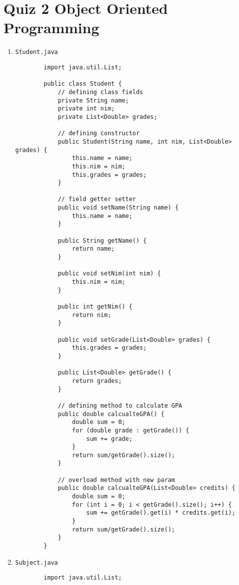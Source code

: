 \documentclass[12pt,titlepage]{article}
\begin{document}
\section{Quiz 2 Object Oriented Programming}
\begin{enumerate}
    \item \texttt{Student.java}
    \begin{verbatim}
        import java.util.List;

        public class Student {
            // defining class fields
            private String name;
            private int nim;
            private List<Double> grades;

            // defining constructor
            public Student(String name, int nim, List<Double> grades) {
                this.name = name;
                this.nim = nim;
                this.grades = grades;
            }

            // field getter setter
            public void setName(String name) {
                this.name = name;
            }

            public String getName() {
                return name;
            }

            public void setNim(int nim) {
                this.nim = nim;
            }

            public int getNim() {
                return nim;
            }

            public void setGrade(List<Double> grades) {
                this.grades = grades;
            }

            public List<Double> getGrade() {
                return grades;
            }

            // defining method to calculate GPA
            public double calcualteGPA() {
                double sum = 0;
                for (double grade : getGrade()) {
                    sum += grade;
                }
                return sum/getGrade().size();
            }

            // overload method with new param
            public double calcualteGPA(List<Double> credits) {
                double sum = 0;
                for (int i = 0; i < getGrade().size(); i++) {
                    sum += getGrade().get(i) * credits.get(i);
                }
                return sum/getGrade().size();
            }
        }
    \end{verbatim}
    \item \texttt{Subject.java}
    \begin{verbatim}
        import java.util.List;


\end{verbatim}
\end{enumerate}
\end{document}
